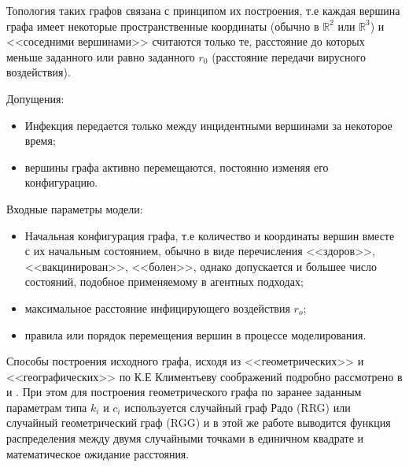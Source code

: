 Топология таких графов связана с принципом их построения, т.е каждая вершина графа имеет некоторые пространственные координаты (обычно в $\mathbb{R}^2$ или $\mathbb{R}^3$) и <<соседними вершинами>> считаются только те, расстояние до которых  меньше заданного или равно заданного $r_0$ (расстояние передачи вирусного воздействия). 

Допущения:
\begin{itemize}
	\item Инфекция передается только между инцидентными вершинами за некоторое время;
	\item вершины графа активно перемещаются, постоянно изменяя его конфигурацию.
\end{itemize}
Входные параметры модели:
\begin{itemize}
	\item Начальная конфигурация графа, т.е количество и координаты вершин вместе с их начальным состоянием, обычно в виде перечисления 	<<здоров>>, <<вакцинирован>>, <<болен>>, однако допускается и большее число состояний, подобное применяемому в агентных подходах;
	\item максимальное расстояние инфицирующего воздействия $r_o$;
	\item правила или порядок перемещения вершин в процессе моделирования.
\end{itemize}

Способы построения исходного графа, исходя из <<геометрических>>  и <<географических>> по К.Е Климентьеву соображений подробно рассмотрено в %
 \cite{Klimentiev:2012} и %
\cite{Klimentiev:2015}. При этом для построения геометрического графа по заранее заданным параметрам типа $k_i$ и $c_i$ используется случайный граф Радо (RRG) или случайный геометрический граф (RGG) и в этой же работе %
\cite{Klimentiev:2015} выводится функция распределения  между двумя случайными точками в единичном квадрате и математическое ожидание расстояния.

